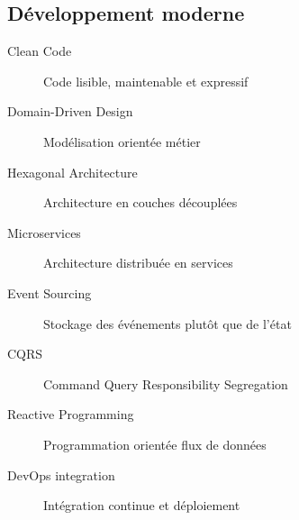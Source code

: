 \documentclass{article}
\begin{document}
\begin{multicols*}{3}

\section*{Développement moderne}
\begin{description}
\item[Clean Code] Code lisible, maintenable et expressif
\item[Domain-Driven Design] Modélisation orientée métier
\item[Hexagonal Architecture] Architecture en couches découplées
\item[Microservices] Architecture distribuée en services
\item[Event Sourcing] Stockage des événements plutôt que de l'état
\item[CQRS] Command Query Responsibility Segregation
\item[Reactive Programming] Programmation orientée flux de données
\item[DevOps integration] Intégration continue et déploiement
\end{description}


\end{multicols*}
\end{document}
